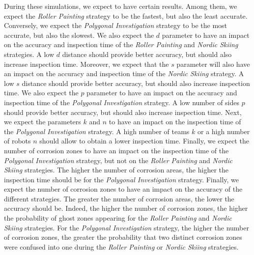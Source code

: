 \documentclass[english,RandD]{rapportPFE}  %
\begin{document}
		During these simulations, we expect to have certain results.
		Among them, we expect the \textit{Roller Painting} strategy to be the fastest, but also the least accurate.
		Conversely, we expect the \textit{Polygonal Investigation} strategy to be the most accurate, but also the slowest.
		We also expect the $d$ parameter to have an impact on the accuracy and inspection time of the \textit{Roller Painting} and \textit{Nordic Skiing} strategies.
		A low $d$ distance should provide better accuracy, but should also increase inspection time.
		Moreover, we expect that the $s$ parameter will also have an impact on the accuracy and inspection time of the \textit{Nordic Skiing} strategy.
		A low $s$ distance should provide better accuracy, but should also increase inspection time.
		We also expect the $p$ parameter to have an impact on the accuracy and inspection time of the \textit{Polygonal Investigation} strategy.
		A low number of sides $p$ should provide better accuracy, but should also increase inspection time.
		Next, we expect the parameters $k$ and $n$ to have an impact on the inspection time of the \textit{Polygonal Investigation} strategy.
		A high number of teams $k$ or a high number of robots $n$ should allow to obtain a lower inspection time.
		Finally, we expect the number of corrosion zones to have an impact on the inspection time of the \textit{Polygonal Investigation} strategy, but not on the \textit{Roller Painting} and \textit{Nordic Skiing} strategies.
		The higher the number of corrosion areas, the higher the inspection time should be for the \textit{Polygonal Investigation} strategy.
		Finally, we expect the number of corrosion zones to have an impact on the accuracy of the different strategies.
		The greater the number of corrosion areas, the lower the accuracy should be.
		Indeed, the higher the number of corrosion zones, the higher the probability of ghost zones appearing for the \textit{Roller Painting} and \textit{Nordic Skiing} strategies.
		For the \textit{Polygonal Investigation} strategy, the higher the number of corrosion zones, the greater the probability that two distinct corrosion zones were confused into one during the \textit{Roller Painting} or \textit{Nordic Skiing} strategies.
\end{document}
